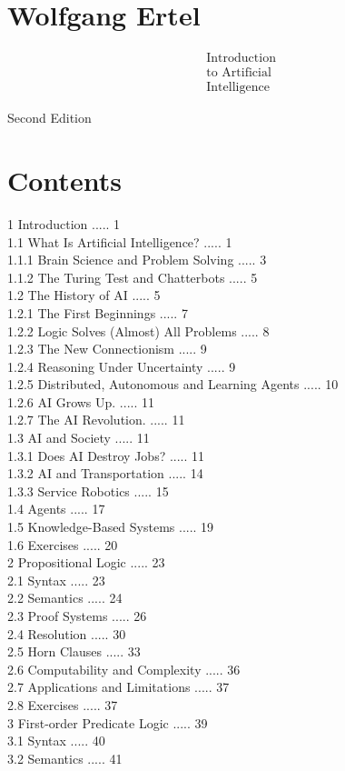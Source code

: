 \documentclass[10pt]{article}
\begin{document}
\section*{Wolfgang Ertel}
$$
\begin{aligned}
& \text { Introduction } \\
& \text { to Artificial } \\
& \text { Intelligence }
\end{aligned}
$$

Second Edition

\section*{Contents}
1 Introduction ..... 1\\
1.1 What Is Artificial Intelligence? ..... 1\\
1.1.1 Brain Science and Problem Solving ..... 3\\
1.1.2 The Turing Test and Chatterbots ..... 5\\
1.2 The History of AI ..... 5\\
1.2.1 The First Beginnings ..... 7\\
1.2.2 Logic Solves (Almost) All Problems ..... 8\\
1.2.3 The New Connectionism ..... 9\\
1.2.4 Reasoning Under Uncertainty ..... 9\\
1.2.5 Distributed, Autonomous and Learning Agents ..... 10\\
1.2.6 AI Grows Up. ..... 11\\
1.2.7 The AI Revolution. ..... 11\\
1.3 AI and Society ..... 11\\
1.3.1 Does AI Destroy Jobs? ..... 11\\
1.3.2 AI and Transportation ..... 14\\
1.3.3 Service Robotics ..... 15\\
1.4 Agents ..... 17\\
1.5 Knowledge-Based Systems ..... 19\\
1.6 Exercises ..... 20\\
2 Propositional Logic ..... 23\\
2.1 Syntax ..... 23\\
2.2 Semantics ..... 24\\
2.3 Proof Systems ..... 26\\
2.4 Resolution ..... 30\\
2.5 Horn Clauses ..... 33\\
2.6 Computability and Complexity ..... 36\\
2.7 Applications and Limitations ..... 37\\
2.8 Exercises ..... 37\\
3 First-order Predicate Logic ..... 39\\
3.1 Syntax ..... 40\\
3.2 Semantics ..... 41\\
\end{document}
